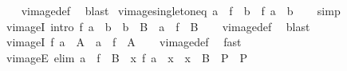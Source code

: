 \begin{isabellebody}
%
\isadelimproof
\ \ %
\endisadelimproof
%
\isatagproof
{}\isamarkupfalse%
\ vimage{\isacharunderscore}{\kern0pt}def\ \isamarkupfalse%
\ blast%
\endisatagproof
{\isafoldproof}%
%
\isadelimproof
\isanewline
%
\endisadelimproof
\isanewline
{}\isamarkupfalse%
\ vimage{\isacharunderscore}{\kern0pt}singleton{\isacharunderscore}{\kern0pt}eq{\isacharcolon}{\kern0pt}\ {\isachardoublequoteopen}a\ {\isasymin}\ f\ {\isacharminus}{\kern0pt}{\isacharbackquote}{\kern0pt}\ {\isacharbraceleft}{\kern0pt}b{\isacharbraceright}{\kern0pt}\ {\isasymlongleftrightarrow}\ f\ a\ {\isacharequal}{\kern0pt}\ b{\isachardoublequoteclose}\isanewline
%
\isadelimproof
\ \ %
\endisadelimproof
%
\isatagproof
{}\isamarkupfalse%
\ simp%
\endisatagproof
{\isafoldproof}%
%
\isadelimproof
\isanewline
%
\endisadelimproof
\isanewline
{}\isamarkupfalse%
\ vimageI\ {\isacharbrackleft}{\kern0pt}intro{\isacharbrackright}{\kern0pt}{\isacharcolon}{\kern0pt}\ {\isachardoublequoteopen}f\ a\ {\isacharequal}{\kern0pt}\ b\ {\isasymLongrightarrow}\ b\ {\isasymin}\ B\ {\isasymLongrightarrow}\ a\ {\isasymin}\ f\ {\isacharminus}{\kern0pt}{\isacharbackquote}{\kern0pt}\ B{\isachardoublequoteclose}\isanewline
%
\isadelimproof
\ \ %
\endisadelimproof
%
\isatagproof
{}\isamarkupfalse%
\ vimage{\isacharunderscore}{\kern0pt}def\ \isamarkupfalse%
\ blast%
\endisatagproof
{\isafoldproof}%
%
\isadelimproof
\isanewline
%
\endisadelimproof
\isanewline
{}\isamarkupfalse%
\ vimageI{}{\isacharcolon}{\kern0pt}\ {\isachardoublequoteopen}f\ a\ {\isasymin}\ A\ {\isasymLongrightarrow}\ a\ {\isasymin}\ f\ {\isacharminus}{\kern0pt}{\isacharbackquote}{\kern0pt}\ A{\isachardoublequoteclose}\isanewline
%
\isadelimproof
\ \ %
\endisadelimproof
%
\isatagproof
{}\isamarkupfalse%
\ vimage{\isacharunderscore}{\kern0pt}def\ \isamarkupfalse%
\ fast%
\endisatagproof
{\isafoldproof}%
%
\isadelimproof
\isanewline
%
\endisadelimproof
\isanewline
{}\isamarkupfalse%
\ vimageE\ {\isacharbrackleft}{\kern0pt}elim{\isacharbang}{\kern0pt}{\isacharbrackright}{\kern0pt}{\isacharcolon}{\kern0pt}\ {\isachardoublequoteopen}a\ {\isasymin}\ f\ {\isacharminus}{\kern0pt}{\isacharbackquote}{\kern0pt}\ B\ {\isasymLongrightarrow}\ {\isacharparenleft}{\kern0pt}{\isasymAnd}x{\isachardot}{\kern0pt}\ f\ a\ {\isacharequal}{\kern0pt}\ x\ {\isasymLongrightarrow}\ x\ {\isasymin}\ B\ {\isasymLongrightarrow}\ P{\isacharparenright}{\kern0pt}\ {\isasymLongrightarrow}\ P{\isachardoublequoteclose}\isanewline

\end{isabellebody}
